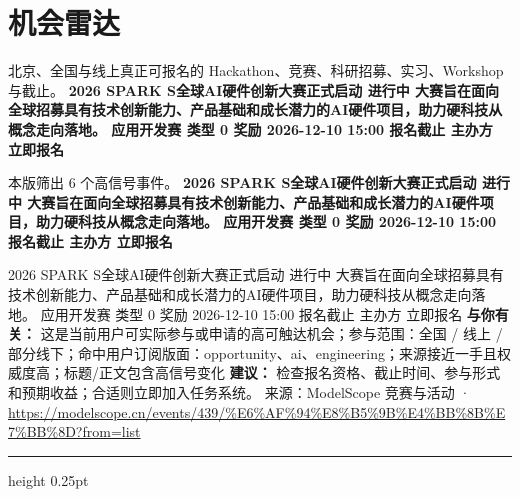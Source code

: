 \documentclass[10.5pt]{ctexart}
\begin{document}
\section*{机会雷达}
{\color{ormuted} 北京、全国与线上真正可报名的 Hackathon、竞赛、科研招募、实习、Workshop 与截止。}
\vspace{2mm}
{\LARGE\bfseries 2026 SPARK S全球AI硬件创新大赛正式启动 进行中 大赛旨在面向全球招募具有技术创新能力、产品基础和成长潜力的AI硬件项目，助力硬科技从概念走向落地。 应用开发赛 类型 0 奖励 2026-12-10 15:00 报名截止 主办方 立即报名}\par
\vspace{1mm}
{\color{ormuted} 本版筛出 6 个高信号事件。}
\vspace{3mm}
{\Large\bfseries 2026 SPARK S全球AI硬件创新大赛正式启动 进行中 大赛旨在面向全球招募具有技术创新能力、产品基础和成长潜力的AI硬件项目，助力硬科技从概念走向落地。 应用开发赛 类型 0 奖励 2026-12-10 15:00 报名截止 主办方 立即报名}\par
2026 SPARK S全球AI硬件创新大赛正式启动 进行中 大赛旨在面向全球招募具有技术创新能力、产品基础和成长潜力的AI硬件项目，助力硬科技从概念走向落地。 应用开发赛 类型 0 奖励 2026-12-10 15:00 报名截止 主办方 立即报名
\textbf{与你有关：} 这是当前用户可实际参与或申请的高可触达机会；参与范围：全国 / 线上 / 部分线下；命中用户订阅版面：opportunity、ai、engineering；来源接近一手且权威度高；标题/正文包含高信号变化
\textbf{建议：} 检查报名资格、截止时间、参与形式和预期收益；合适则立即加入任务系统。
{\footnotesize\color{ormuted} 来源：ModelScope 竞赛与活动 · \url{https://modelscope.cn/events/439/%E6%AF%94%E8%B5%9B%E4%BB%8B%E7%BB%8D?from=list}}
\vspace{4mm}
\hrule height 0.25pt
\vspace{3mm}
\end{document}

